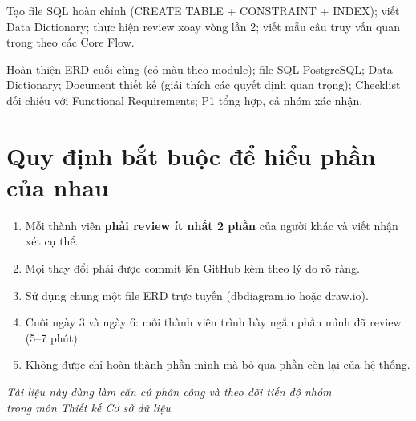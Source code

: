 \documentclass[12pt,a4paper]{article}
\begin{document}
\begin{description}[style=nextline, leftmargin=1.5cm, font=\bfseries\color{blue!60!black}]
    \vspace{8pt}

    \item[\textbf{Ngày 6 -- Gộp schema + Data Dictionary + Review lần 2}]
    \vspace{4pt}
    Tạo file SQL hoàn chỉnh (CREATE TABLE + CONSTRAINT + INDEX); viết Data Dictionary; thực hiện review xoay vòng lần 2; viết mẫu câu truy vấn quan trọng theo các Core Flow.

    \vspace{8pt}

    \item[\textbf{Ngày 7 -- Hoàn thiện \& Nộp bài}]
    \vspace{4pt}
    Hoàn thiện ERD cuối cùng (có màu theo module); file SQL PostgreSQL; Data Dictionary; Document thiết kế (giải thích các quyết định quan trọng); Checklist đối chiếu với Functional Requirements; P1 tổng hợp, cả nhóm xác nhận.

\end{description}

\vspace{10pt}

\section{Quy định bắt buộc để hiểu phần của nhau}

\begin{enumerate}[leftmargin=*]
    \item Mỗi thành viên \textbf{phải review ít nhất 2 phần} của người khác và viết nhận xét cụ thể.
    \item Mọi thay đổi phải được commit lên GitHub kèm theo lý do rõ ràng.
    \item Sử dụng chung một file ERD trực tuyến (dbdiagram.io hoặc draw.io).
    \item Cuối ngày 3 và ngày 6: mỗi thành viên trình bày ngắn phần mình đã review (5--7 phút).
    \item Không được chỉ hoàn thành phần mình mà bỏ qua phần còn lại của hệ thống.
\end{enumerate}

\vspace{15pt}

\begin{center}
\large\textit{Tài liệu này dùng làm căn cứ phân công và theo dõi tiến độ nhóm}\\
\textit{trong môn Thiết kế Cơ sở dữ liệu}
\end{center}
\end{document}
